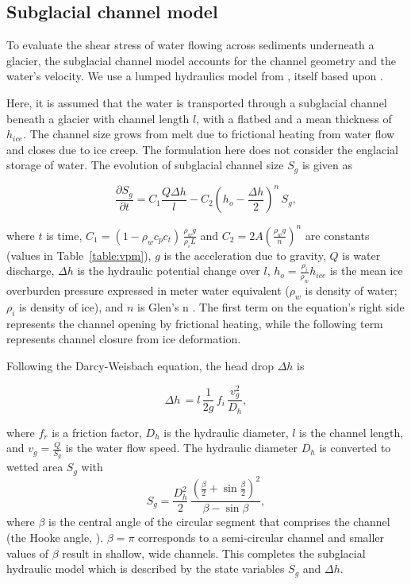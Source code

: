 \documentclass[esurf, manuscript]{copernicus}
\begin{document}
\subsection{Subglacial channel  model}
\label{sect:sub_mode}

To evaluate the shear stress of water flowing across sediments underneath a glacier, the subglacial channel model accounts for the channel geometry and the water's velocity.
We use a lumped hydraulics model from \citet{werder2010b}, itself based upon  \citet{clarke1996}.

Here, it is assumed that the water is transported through a subglacial channel \citep[Figure~\ref{fig:cartoon}; ][]{rothlisberger1972} beneath a glacier with channel length $l$, with a flatbed and a mean thickness of $h_{ice}$.
The channel size grows from melt due to frictional heating from water flow and closes due to ice creep.
The formulation here does not consider the englacial storage of water.
The evolution of subglacial channel size $S_g$ is given as
\begin{linenomath*}
  \begin{equation}
    \label{eq:dS_dt}
    \frac{\partial S_g}{\partial t} = C_1 \frac{Q \Delta h}{l} - C_2 \left(h_{o}-\frac{\Delta h}{2}\right)^n\,S_g,
  \end{equation}
\end{linenomath*}
\noindent where $t$ is time, $C_1= (1-\rho_wc_pc_t)\,\frac{\rho_wg}{\rho_iL}$ and $C_2=2A(\frac{\rho_wg}{n})^n$ are constants (values in Table~\ref{table:vpm}), $g$ is the acceleration due to gravity, $Q$ is water discharge, $\Delta h$ is the hydraulic potential change over $l$, $h_{o}= \frac{\rho_i}{\rho_w} h_{ice}$ is the mean ice overburden pressure expressed in meter water equivalent ($\rho_w$ is density of water; $\rho_i$ is density of ice), and $n$ is Glen's n \citep[usually $n=3$][]{glen1955}.
The first term on the equation's right side represents the channel opening by frictional heating, while the following term represents channel closure from ice deformation.


Following the Darcy-Weisbach equation, the head drop $\Delta h$ is
\begin{linenomath*}
  \begin{equation}
    \label{eq:dh}
    \Delta h \,  = l \,\frac{1}{2g} \,f_i\,\frac{v_{g}^{2}}{D_h},
  \end{equation}
\end{linenomath*}
\noindent where $f_r$ is a friction factor, $D_h$ is the hydraulic diameter, $l$ is the channel length, and $v_g=\frac{Q}{S_g}$ is the water flow speed.
% 
The hydraulic diameter $D_h$ is converted to wetted area $S_g$ with
\begin{equation}
  \label{eq:Dh2S}
  S_g= \frac{D_h^2}{2}\,\frac{(\frac{\beta}{2}+\sin \frac{\beta}{2})^2}{\beta - \sin \beta},
\end{equation}
where $\beta$ is the central angle of the circular segment that comprises the channel (the Hooke angle, \citet{hooke1990}). $\beta =\pi$ corresponds to a semi-circular channel and smaller values of $\beta$ result in shallow, wide channels.
This completes the subglacial hydraulic model which is described by the state variables $S_g$ and $\Delta h$.
\end{document}
